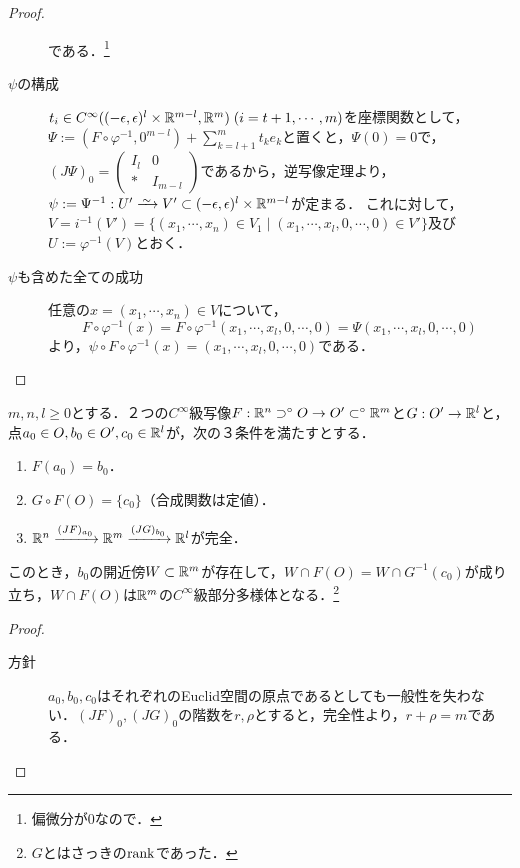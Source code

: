 \documentclass[uplatex,dvipdfmx]{jsreport}
\begin{document}
\begin{proof}
\begin{description}
        である．\footnote{偏微分が$0$なので．}
        \item[$\psi$の構成] $t_i\in C^\infty((-\epsilon,\epsilon)^l\times\mathbb{R}^{m-l},\mathbb{R}^m)\;(i=t+1,\cdots,m)$を座標関数として，
        $\Psi:=(F\circ\varphi^{-1},0^{m-l})+\sum^m_{k=l+1}t_ke_k$と置くと，$\Psi(0)=0$で，$(J\Psi)_0=\begin{pmatrix}I_l&0\\*&I_{m-l}\end{pmatrix}$であるから，逆写像定理より，$\psi:=\Psi^{-1}:U'\iso V'\subset(-\epsilon,\epsilon)^l\times\R^{m-l}$が定まる．
        これに対して，$V=i^{-1}(V')=\{(x_1,\cdots,x_n)\in V_1\mid (x_1,\cdots,x_l,0,\cdots,0)\in V'\}$及び$U:=\varphi^{-1}(V)$とおく．
        \item[$\psi$も含めた全ての成功]
        任意の$x=(x_1,\cdots,x_n)\in V$について，\[F\circ\varphi^{-1}(x)=F\circ\varphi^{-1}(x_1,\cdots,x_l,0,\cdots,0)=\Psi(x_1,\cdots,x_l,0,\cdots,0)\]より，$\psi\circ F\circ\varphi^{-1}(x)=(x_1,\cdots,x_l,0,\cdots,0)$である．
    \end{description}
\end{proof}

\begin{theorem}[一般化]\label{thm-generalized-implicit-function-theorem}
    $m,n,l\ge 0$とする．２つの$C^\infty$級写像$F:\mathbb{R}^n\supset^\circ O\to O'\subset^\circ\mathbb{R}^m$と$G:O'\to\mathbb{R}^l$と，点$a_0\in O,b_0\in O',c_0\in\mathbb{R}^l$が，次の３条件を満たすとする．
    \begin{enumerate}
        \item $F(a_0)=b_0$．
        \item $G\circ F(O)=\{c_0\}$（合成関数は定値）．
        \item $\mathbb{R}^n\xrightarrow{(JF)_{a_0}}\mathbb{R}^m\xrightarrow{(JG)_{b_0}}\mathbb{R}^l$が完全．
    \end{enumerate}
    このとき，$b_0$の開近傍$W\subset\mathbb{R}^m$が存在して，$W\cap F(O)=W\cap G^{-1}(c_0)$が成り立ち，$W\cap F(O)$は$\mathbb{R}^m$の$C^\infty$級部分多様体となる．\footnote{$G$とはさっきの$\mathrm{rank}$であった．}
\end{theorem}
\begin{proof}\mbox{}
    \begin{description}
        \item[方針] $a_0,b_0,c_0$はそれぞれのEuclid空間の原点であるとしても一般性を失わない．$(JF)_0,(JG)_0$の階数を$r,\rho$とすると，完全性より，$r+\rho=m$である．
    \end{description}
\end{proof}
\end{document}
